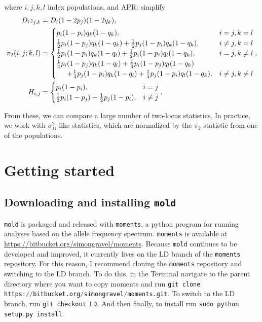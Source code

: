 \documentclass[10pt]{article}
\makeatletter
\newcommand{\comment}[1]{{\color{blue}APR: #1}}
\newcommand{\mold}{\texttt{mold}\xspace}
\newcommand{\py}[1]{\lstinline[breaklines=true,language=Python, showstringspaces=False]@#1@}
\makeatother
\begin{document}
where $i,j,k,l$ index populations, and \comment{simplify}
\begin{align*}
 D_iz_{j,k} & = D_i (1-2p_j)(1-2q_k), \\
 {\pi_2}(i,j;k,l) & = \begin{cases}
 				p_i(1-p_i)q_k(1-q_k), & i=j, k=l \\
				\frac{1}{2} p_i(1-p_j) q_k(1-q_k) + \frac{1}{2} p_j(1-p_i) q_k(1-q_k), & i\not= j, k=l \\
				\frac{1}{2} p_i(1-p_i) q_k(1-q_l) + \frac{1}{2} p_i(1-p_i) q_l(1-q_k), & i=j, k\not=l \\
				\frac{1}{4} p_i(1-p_j) q_k(1-q_l) + \frac{1}{4} p_i(1-p_j) q_l(1-q_k) & \\
					\hspace{15 pt} + \frac{1}{4} p_j(1-p_i) q_k(1-q_l) + \frac{1}{4} p_j(1-p_i) q_l(1-q_k) , & i\not=j, k\not=l
 			\end{cases}, \\
 H_{i,j} & = \begin{cases} 
 			p_i(1-p_i), & i = j \\ 
			\frac{1}{2}p_i(1-p_j) + \frac{1}{2}p_j(1-p_i),& i \not= j 
		\end{cases}.
\end{align*}

From these, we can compare a large number of two-locus statistics.
In practice, we work with $\sigma_D^2$-like statistics, which are normalized by the $\pi_2$ statistic from one of the populations.


\section{Getting started}

\subsection{Downloading and installing \mold}

\mold is packaged and released with \py{moments}, a python program for running analyses based on the allele frequency spectrum.
\py{moments} is available at \url{https://bitbucket.org/simongravel/moments}.
Because \mold continues to be developed and improved, it currently lives on the LD branch of the \py{moments} repository.
For this reason, I recommend cloning the \py{moments} repository and switching to the LD branch.
To do this, in the Terminal navigate to the parent directory where you want to copy moments and run
\py{git clone https://bitbucket.org/simongravel/moments.git}.
To switch to the LD branch, run
\py{git checkout LD}.
And then finally, to install run
\py{sudo python setup.py install}.
\end{document}
